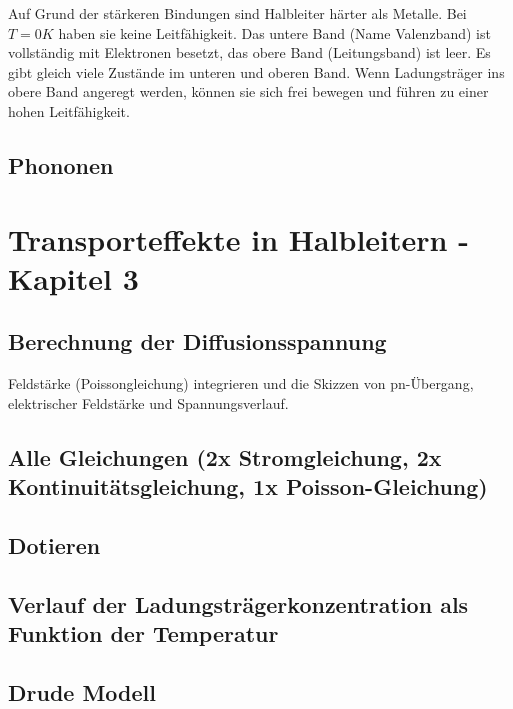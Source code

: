 \documentclass{article}
\begin{document}
Auf Grund der st\"arkeren Bindungen sind Halbleiter h\"arter als Metalle. Bei $T=0K$ haben sie keine Leitf\"ahigkeit.
Das untere Band (Name Valenzband) ist vollständig mit Elektronen besetzt, das obere Band (Leitungsband) ist leer.
Es gibt gleich viele Zustände im unteren und oberen Band. Wenn Ladungsträger ins obere Band angeregt werden, können
sie sich frei bewegen und führen zu einer hohen Leitfähigkeit.
\subsection{Phononen }\label{k2:phononen}

\section{Transporteffekte in Halbleitern - Kapitel 3}

\subsection{Berechnung der Diffusionsspannung }\label{k3:diffusion}
Feldst\"arke (Poissongleichung) integrieren und die Skizzen von pn-\"Ubergang, elektrischer
Feldst\"arke und Spannungsverlauf.

\subsection{Alle Gleichungen (2x Stromgleichung, 2x Kontinuitätsgleichung, 1x Poisson-Gleichung) }\label{k3:alleGleichungen}

\subsection{Dotieren }\label{k3:dotieren}

\subsection{Verlauf der Ladungstr\"agerkonzentration als Funktion der Temperatur }\label{k3:ladungstraegerkonz}

\subsection{Drude Modell }\label{k3:drude}
\end{document}
